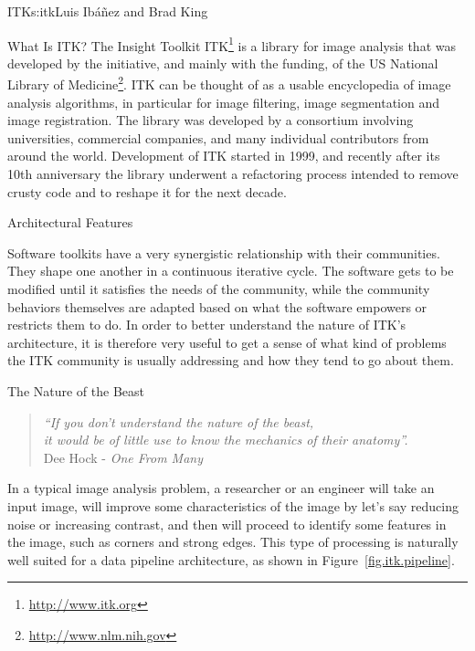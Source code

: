 \begin{aosachapter}{ITK}{s:itk}{Luis Ib\'{a}\~{n}ez and Brad King}


\begin{aosasect1}{What Is ITK?}
The Insight Toolkit ITK\footnote{\url{http://www.itk.org}} is a library for
image analysis that was developed by the initiative, and mainly with the
funding, of the US National Library of
Medicine\footnote{\url{http://www.nlm.nih.gov}}. ITK can be thought of as a
usable encyclopedia of image analysis algorithms, in particular for image
filtering, image segmentation and image registration. The library was developed
by a consortium involving universities, commercial companies, and many
individual contributors from around the world.  Development of ITK started in
1999, and recently after its 10th anniversary the library underwent a
refactoring process intended to remove crusty code and to reshape it for the
next decade.
\end{aosasect1}

\begin{aosasect1}{Architectural Features}

Software toolkits have a very synergistic relationship with their communities.
They shape one another in a continuous iterative cycle.  The software gets to
be modified until it satisfies the needs of the community, while the community
behaviors themselves are adapted based on what the software empowers or
restricts them to do. In order to better understand the nature of ITK's
architecture, it is therefore very useful to get a sense of what kind of
problems the ITK community is usually addressing and how they tend to go about
them.

\begin{aosasect2}{The Nature of the Beast}

\begin{center}
\begin{quotation}
\emph{
``If you don't understand the nature of the beast,\\
it would be of little use to know the mechanics of their anatomy''.\\
}
\hfill Dee Hock - \emph{One From Many}
\end{quotation}
\end{center}

In a typical image analysis problem, a researcher or an engineer will take an
input image, will improve some characteristics of the image by let's say
reducing noise or increasing contrast, and then will proceed to identify some
features in the image, such as corners and strong edges. This type of
processing is naturally well suited for a data pipeline architecture, as
shown in Figure~\ref{fig.itk.pipeline}.


\end{aosasect2}
\end{aosasect1}
\end{aosachapter}
